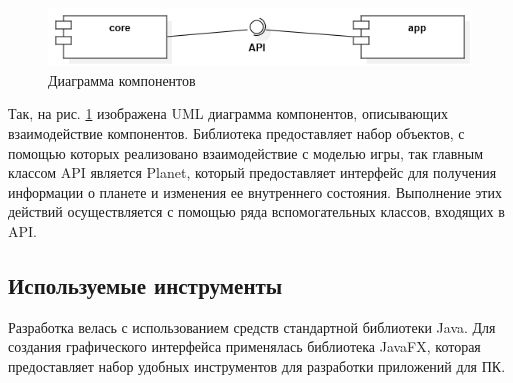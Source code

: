 \begin{figure}[H]
	\begin{center}
		\includegraphics[scale=0.7]{../../uml/ComponentDiagram1.png}
		\caption{Диаграмма компонентов}
		\label{pic:components}
	\end{center}
\end{figure}

Так, на рис. \ref{pic:components} изображена UML диаграмма компонентов, описывающих взаимодействие компонентов. Библиотека предоставляет набор объектов, с помощью которых реализовано взаимодействие с моделью игры, так главным классом API является Planet, который предоставляет интерфейс для получения информации о планете и изменения ее внутреннего состояния. Выполнение этих действий осуществляется с помощью ряда вспомогательных классов, входящих в API.   


%
%
%

\subsection{Используемые инструменты}

Разработка велась с использованием средств стандартной библиотеки Java. Для создания графического интерфейса применялась библиотека JavaFX, которая предоставляет набор удобных инструментов для разработки приложений для ПК.

